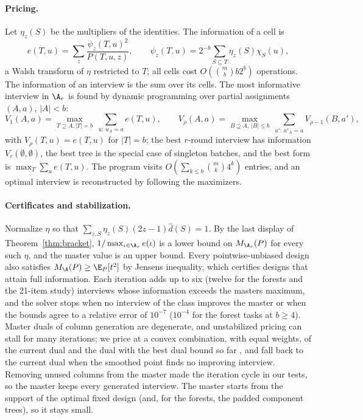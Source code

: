 \paragraph{Pricing.}
Let $\eta_z(S)$ be the multipliers of the identities. The information of a cell is
\[
 e(T,u)=\sum_z\frac{\psi_z(T,u)^2}{P(T,u,z)},\qquad \psi_z(T,u)=2^{-b}\sum_{S\subseteq T}\eta_z(S)\chi_S(u),
\]
a Walsh transform of $\eta$ restricted to $T$; all cells cost $O(\binom mbb2^b)$ operations. The information of an interview is the sum over its cells. The most informative interview in $\A_r$ is found by dynamic programming over partial assignments $(A,a)$, $|A|<b$:
\[
 V_1(A,a)=\max_{T\supseteq A,|T|=b}\ \sum_{u:\,u_A=a}e(T,u),\qquad
 V_\rho(A,a)=\max_{B\supsetneq A,\,|B|\le b}\ \sum_{a':\,a'_A=a}V_{\rho-1}(B,a'),
\]
with $V_\rho(T,u)=e(T,u)$ for $|T|=b$; the best $r$-round interview has information $V_r(\emptyset,\emptyset)$, the best tree is the special case of singleton batches, and the best form is $\max_T\sum_ue(T,u)$. The program visits $O(\sum_{k\le b}\binom mk4^k)$ entries, and an optimal interview is reconstructed by following the maximizers.

\paragraph{Certificates and stabilization.}
Normalize $\eta$ so that $\sum_{z,S}\eta_z(S)(2z-1)\widehat d(S)=1$. By the last display of Theorem~\ref{thm:bracket}, $1/\max_{\iota\in\A_r}e(\iota)$ is a lower bound on $M_{\A_r}(P)$ for every such $\eta$, and the master value is an upper bound. Every pointwise-unbiased design also satisfies $M_\A(P)\ge\E_P[t^2]$ by Jensen\textquotesingle s inequality, which certifies designs that attain full information. Each iteration adds up to six (twelve for the forests and the 21-item study) interviews whose information exceeds the master\textquotesingle s maximum, and the solver stops when no interview of the class improves the master or when the bounds agree to a relative error of $10^{-7}$ ($10^{-4}$ for the forest tasks at $b\ge4$). Master duals of column generation are degenerate, and unstabilized pricing can stall for many iterations; we price at a convex combination, with equal weights, of the current dual and the dual with the best dual bound so far \citep{wentges1997}, and fall back to the current dual when the smoothed point finds no improving interview. Removing unused columns from the master made the iteration cycle in our tests, so the master keeps every generated interview. The master starts from the support of the optimal fixed design (and, for the forests, the padded component trees), so it stays small.

